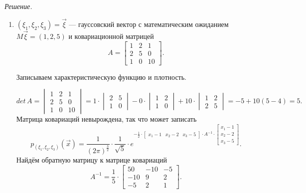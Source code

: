 \textit{Решение.}
\begin{enumerate}[label=\alph*)]
  \item $ \left( \xi_1, \xi_2, \xi_3 \right) = \vec{ \xi }$ ---
  гауссовский вектор с математическим ожиданием $M \vec{ \xi } = \left( 1, 2, 5 \right) $
  и ковариационной матрицей
  $$A =
    \begin{bmatrix}
      1 & 2 & 1 \\
      2 & 5 & 0 \\
      1 & 0 & 10
    \end{bmatrix}.$$

  Записываем характеристическую функцию и плотность.

  $$det \, A =
    \begin{vmatrix}
      1 & 2 & 1 \\
      2 & 5 & 0 \\
      1 & 0 & 10
    \end{vmatrix} =
    1 \cdot
    \begin{vmatrix}
      2 & 5 \\
      1 & 0
    \end{vmatrix} - 0 \cdot
    \begin{vmatrix}
      1 & 2 \\
      1 & 0
    \end{vmatrix} + 10 \cdot
    \begin{vmatrix}
      1 & 2 \\
      2 & 5
    \end{vmatrix} =
    -5 + 10 \left( 5 - 4 \right) =
    5.$$
  Матрица ковариаций невырождена, так что может записать
  $$p_{ \left( \xi_1, \xi_2, \xi_3 \right) } \left( \vec{x} \right) =
    \frac{1}{ \left( 2 \pi \right)^{ \frac{3}{2}}} \cdot \frac{1}{ \sqrt{5}} \cdot
    e^{- \frac{1}{2} \cdot
      \begin{bmatrix}
        x_1 - 1 & x_2 - 2 & x_3 - 5
      \end{bmatrix} \cdot A^{-1} \cdot
      \begin{bmatrix}
        x_1 - 1 \\
        x_2 - 2 \\
        x_3 - 5
      \end{bmatrix}}.$$
  Найдём обратную матрицу к матрице ковариаций
  $$A^{-1} =
    \frac{1}{5} \cdot
    \begin{bmatrix}
      50 & -10 & -5 \\
      -10 & 9 & 2 \\
      -5 & 2 & 1
    \end{bmatrix}.$$

\end{enumerate}
